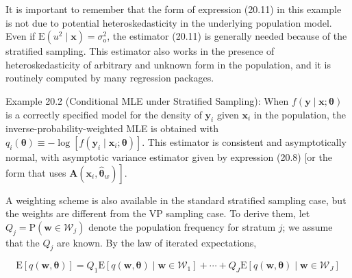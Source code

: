 \documentclass[10pt]{article}
\begin{document}
It is important to remember that the form of expression (20.11) in this example is not due to potential heteroskedasticity in the underlying population model. Even if $\mathrm{E}\left(u^{2} \mid \mathbf{x}\right)=\sigma_{\mathrm{o}}^{2}$, the estimator (20.11) is generally needed because of the stratified sampling. This estimator also works in the presence of heteroskedasticity of arbitrary and unknown form in the population, and it is routinely computed by many regression packages.

Example 20.2 (Conditional MLE under Stratified Sampling): When $f(\mathbf{y} \mid \mathbf{x} ; \boldsymbol{\theta})$ is a correctly specified model for the density of $\mathbf{y}_{i}$ given $\mathbf{x}_{i}$ in the population, the inverse-probability-weighted MLE is obtained with $q_{i}(\boldsymbol{\theta}) \equiv-\log \left[f\left(\mathbf{y}_{i} \mid \mathbf{x}_{i} ; \boldsymbol{\theta}\right)\right]$. This estimator is consistent and asymptotically normal, with asymptotic variance estimator given by expression (20.8) [or the form that uses $\left.\mathbf{A}\left(\mathbf{x}_{i}, \hat{\boldsymbol{\theta}}_{w}\right)\right]$.

A weighting scheme is also available in the standard stratified sampling case, but the weights are different from the VP sampling case. To derive them, let $Q_{j}= \mathrm{P}\left(\mathbf{w} \in \mathscr{W}_{j}\right)$ denote the population frequency for stratum $j$; we assume that the $Q_{j}$ are known. By the law of iterated expectations,


\begin{equation*}
\mathrm{E}[q(\mathbf{w}, \boldsymbol{\theta})]=Q_{1} \mathrm{E}\left[q(\mathbf{w}, \boldsymbol{\theta}) \mid \mathbf{w} \in \mathscr{W}_{1}\right]+\cdots+Q_{J} \mathrm{E}\left[q(\mathbf{w}, \boldsymbol{\theta}) \mid \mathbf{w} \in \mathscr{W}_{J}\right] \tag{20.12}
\end{equation*}
\end{document}
